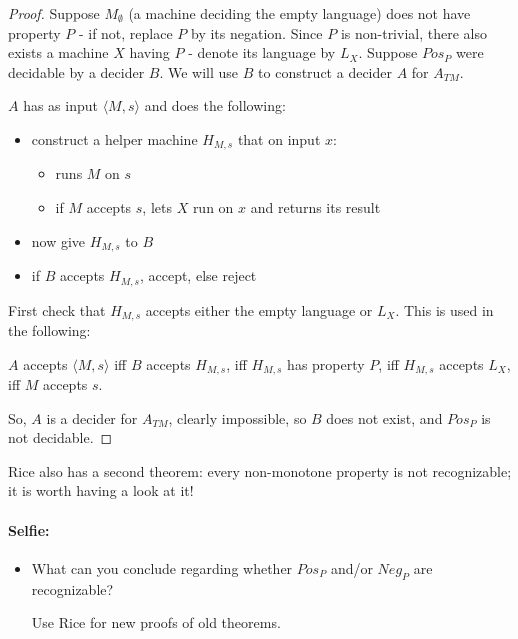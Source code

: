 
\begin{proof}
Suppose $M_\emptyset$ (a machine deciding the empty language) does not
have property $P$ - if not, replace $P$ by its negation. Since $P$ is
non-trivial, there also exists a machine $X$ having $P$ - denote
its language by $L_X$. Suppose $Pos_P$ were decidable by a decider
$B$. We will use $B$ to construct a decider $A$ for $A_{TM}$.

$A$ has as input $\langle M,s \rangle$ and does the following:
\begin{itemize}
\item construct a helper machine $H_{M,s}$ that on input $x$:

\begin{itemize}
\item runs $M$ on $s$
\item if $M$ accepts $s$, lets $X$ run on $x$ and returns its result
\end{itemize}

\item now give $H_{M,s}$ to $B$
\item if $B$ accepts $H_{M,s}$, accept, else reject
\end{itemize}
First check that $H_{M,s}$ accepts either the empty language or
$L_X$. This is used in the following:


$A$ accepts $\langle M,s \rangle$ iff $B$ accepts $H_{M,s}$, iff
%
$H_{M,s}$ has property $P$, iff
%
$H_{M,s}$ accepts $L_X$, iff
%
$M$ accepts $s$.

So, $A$ is a decider for $A_{TM}$, clearly impossible, so $B$ does not
exist, and $Pos_P$ is not decidable.
\end{proof} 

Rice also has a second theorem: every non-monotone property is not
recognizable; it is worth having a look at it!

\paragraph{Selfie:}
\begin{itemize}
\item[]
What can you conclude regarding whether $Pos_P$ and/or $Neg_P$ are
recognizable?

Use Rice for new proofs of old theorems.
\end{itemize}


